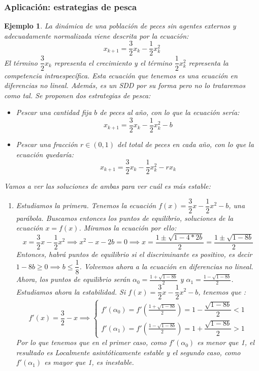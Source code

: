 \documentclass[11pt, a4paper]{article}
\newif\IfInSansMode
\numberwithin{equation}{section}
\theoremstyle{theorem-style}
\theoremstyle{definition-style}
\theoremstyle{remark-style}
\theoremstyle{example-style}
\newtheorem{ejemplo}{Ejemplo}[section]
\begin{document}
\subsubsection{Aplicación: estrategias de pesca}
\begin{ejemplo}
	La dinámica de una población de peces sin agentes externos y adecuadamente normalizada viene descrita por la ecuación:
	\[
	x_{k+1}= \dfrac{3}{2}x_k -\dfrac{1}{2} x_k^2
	\]
	El término $\dfrac{3}{2}x_k$ representa el crecimiento y el término $\dfrac{1}{2} x_k^2$ representa la competencia intraespecífica.
	Esta ecuación que tenemos es una ecuación en diferencias no lineal. Además, es un SDD por su forma pero no lo trataremos como tal.
	Se proponen dos estrategias de pesca:
	\begin{itemize}
	\item Pescar una cantidad fija $b$ de peces al año, con lo que la ecuación sería:
	\[
	x_{k+1}= \dfrac{3}{2}x_k -\dfrac{1}{2} x_k^2 -b
	\]
	\item Pescar una fracción $r\in(0,1)$ del total de peces en cada año, con lo que la ecuación quedaría:
	\[
	x_{k+1}= \dfrac{3}{2}x_k -\dfrac{1}{2} x_k^2 -rx_k
	\]
	
\end{itemize}
Vamos a ver las soluciones de ambas para ver cuál es más estable:
\begin{enumerate}
	\item Estudiamos la primera. Tenemos la ecuación $f(x) = \dfrac{3}{2}x -\dfrac{1}{2} x^2 -b $, una parábola.
	Buscamos entonces los puntos de equilibrio, soluciones de la ecuación $x=f(x)$. Miramos la ecuación por ello:
	\[
	x= \dfrac{3}{2}x -\dfrac{1}{2} x^2 \implies x^2 -x - 2b = 0\implies x= \frac{1\pm \sqrt{1-4*2b}}{2}= \frac{1\pm \sqrt{1-8b}}{2}
	\]
	Entonces, habrá puntos de equilibrio si el discriminante es positivo, es decir $1-8b \geq 0 \implies b \leq \dfrac{1}{8}$. Volvemos ahora a la ecuación en diferencias no lineal.
	Ahora, los puntos de equilibrio serán $\alpha_0 = \frac{1 + \sqrt{1-8b}}{2}$ y $\alpha_1 = \frac{1- \sqrt{1-8b}}{2}$. Estudiamos ahora la estabilidad. Si $f(x) = \dfrac{3}{2}x-\dfrac{1}{2}x^2 -b$, tenemos que :
	\[
	f'(x)= \dfrac{3}{2}-x \implies \begin{cases}
	f'(\alpha_0) = f'(\frac{1 + \sqrt{1-8b}}{2}) = 1- \dfrac{\sqrt{1-8b}}{2} <1\\
	f'(\alpha_1) = f'(\frac{1 - \sqrt{1-8b}}{2})=1+ \dfrac{\sqrt{1-8b}}{2} > 1
\end{cases}
	\]
	Por lo que tenemos que en el primer caso, como $f'(\alpha_0)$ es menor que 1, el resultado es Localmente asintóticamente estable y el segundo caso, como $f'(\alpha_1)$ es mayor que 1, es inestable.
	

\end{enumerate}
\end{ejemplo}
\end{document}

